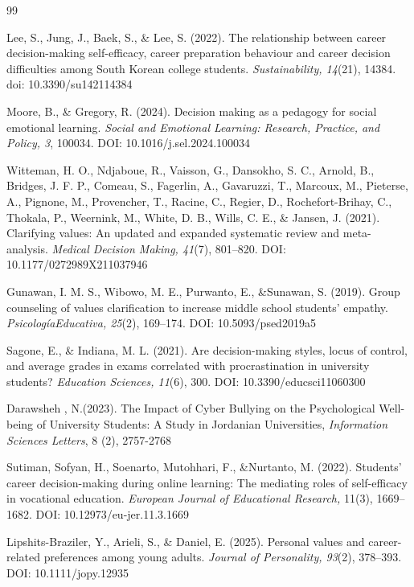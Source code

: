 \documentclass[10pt]{NSP1}
\begin{document}
\begin{thebibliography}{99}

 Lee, S., Jung, J., Baek, S., \& Lee, S. (2022). The relationship between career decision-making self-efficacy, career preparation behaviour and career decision difficulties among South Korean college students. \emph{Sustainability, 14}(21), 14384. doi: 10.3390/su142114384

 Moore, B., \& Gregory, R. (2024). Decision making as a pedagogy for social emotional learning. \emph{Social and Emotional Learning: Research, Practice, and Policy, 3}, 100034. DOI: 10.1016/j.sel.2024.100034

 Witteman, H. O., Ndjaboue, R., Vaisson, G., Dansokho, S. C., Arnold, B., Bridges, J. F. P., Comeau, S., Fagerlin, A., Gavaruzzi, T., Marcoux, M., Pieterse, A., Pignone, M., Provencher, T., Racine, C., Regier, D., Rochefort-Brihay, C., Thokala, P., Weernink, M., White, D. B., Wills, C. E., \& Jansen, J. (2021). Clarifying values: An updated and expanded systematic review and meta-analysis. \emph{Medical Decision Making, 41}(7), 801--820. DOI: 10.1177/0272989X211037946

 Gunawan, I. M. S., Wibowo, M. E., Purwanto, E., \&Sunawan, S. (2019). Group counseling of values clarification to increase middle school students' empathy. \emph{PsicologíaEducativa, 25}(2), 169--174. DOI: 10.5093/psed2019a5

 Sagone, E., \& Indiana, M. L. (2021). Are decision-making styles, locus of control, and average grades in exams correlated with procrastination in university students? \emph{Education Sciences, 11}(6), 300. DOI: 10.3390/educsci11060300

 Darawsheh , N.(2023). The Impact of Cyber Bullying on the Psychological Well-being of University Students: A Study in Jordanian Universities, \emph{Information Sciences Letters}, 8 (2), 2757-2768

 Sutiman, Sofyan, H., Soenarto, Mutohhari, F., \&Nurtanto, M. (2022). Students' career decision-making during online learning: The mediating roles of self-efficacy in vocational education. \emph{European Journal of Educational Research,} 11(3), 1669--1682. DOI: 10.12973/eu-jer.11.3.1669

 Lipshits-Braziler, Y., Arieli, S., \& Daniel, E. (2025). Personal values and career-related preferences among young adults. \emph{Journal of Personality, 93}(2), 378--393. DOI: 10.1111/jopy.12935


\end{thebibliography}
\end{document}
